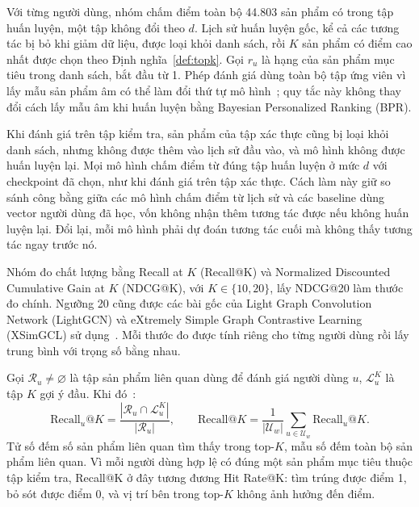 Với từng người dùng, nhóm chấm điểm toàn bộ 44.803 sản phẩm có trong tập huấn luyện, một tập không đổi theo $d$. Lịch sử huấn luyện gốc, kể cả các tương tác bị bỏ khi giảm dữ liệu, được loại khỏi danh sách, rồi $K$ sản phẩm có điểm cao nhất được chọn theo Định nghĩa~\ref{def:topk}. Gọi $r_u$ là hạng của sản phẩm mục tiêu trong danh sách, bắt đầu từ 1. Phép đánh giá dùng toàn bộ tập ứng viên vì lấy mẫu sản phẩm âm có thể làm đổi thứ tự mô hình~\cite{krichene2020sampled}; quy tắc này không thay đổi cách lấy mẫu âm khi huấn luyện bằng Bayesian Personalized Ranking (BPR).

Khi đánh giá trên tập kiểm tra, sản phẩm của tập xác thực cũng bị loại khỏi danh sách, nhưng không được thêm vào lịch sử đầu vào, và mô hình không được huấn luyện lại. Mọi mô hình chấm điểm từ đúng tập huấn luyện ở mức $d$ với checkpoint đã chọn, như khi đánh giá trên tập xác thực. Cách làm này giữ so sánh công bằng giữa các mô hình chấm điểm từ lịch sử và các baseline dùng vector người dùng đã học, vốn không nhận thêm tương tác được nếu không huấn luyện lại. Đổi lại, mỗi mô hình phải dự đoán tương tác cuối mà không thấy tương tác ngay trước nó.

\label{sec:ranking-metrics}

Nhóm đo chất lượng bằng Recall at $K$ (Recall@K) và Normalized Discounted Cumulative Gain at $K$ (NDCG@K), với $K\in\{10,20\}$, lấy NDCG@20 làm thước đo chính. Ngưỡng 20 cũng được các bài gốc của Light Graph Convolution Network (LightGCN) và eXtremely Simple Graph Contrastive Learning (XSimGCL) sử dụng~\cite{he2020lightgcn,yu2023xsimgcl}. Mỗi thước đo được tính riêng cho từng người dùng rồi lấy trung bình với trọng số bằng nhau.

Gọi $\mathcal{R}_u\ne\varnothing$ là tập sản phẩm liên quan dùng để đánh giá người dùng $u$, $\mathcal{L}_u^K$ là tập $K$ gợi ý đầu. Khi đó~\cite{rendle2019metrics}:
\begin{equation}
\mathrm{Recall}_u@K=\frac{|\mathcal{R}_u\cap\mathcal{L}_u^K|}{|\mathcal{R}_u|},
\qquad
\mathrm{Recall@}K=\frac{1}{|\mathcal{U}_w|}
\sum_{u\in\mathcal{U}_w}\mathrm{Recall}_u@K.
\label{eq:recall-evaluation}
\end{equation}
Tử số đếm số sản phẩm liên quan tìm thấy trong top-$K$, mẫu số đếm toàn bộ sản phẩm liên quan. Vì mỗi người dùng hợp lệ có đúng một sản phẩm mục tiêu thuộc tập kiểm tra, Recall@K ở đây tương đương Hit Rate@K: tìm trúng được điểm 1, bỏ sót được điểm 0, và vị trí bên trong top-$K$ không ảnh hưởng đến điểm.

